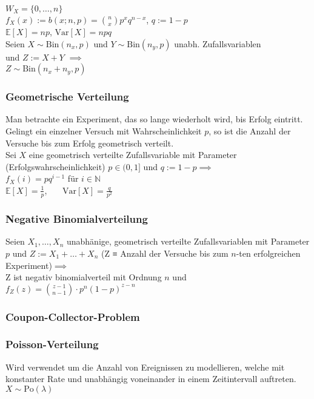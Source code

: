 \documentclass[a4paper,9pt]{extarticle}
\newcommand{\Var}{\text{Var}}
\begin{document}
$W_X = \{0, \dots, n\}$ \\
$f_X(x) := b(x;n,p) = \binom{n}{x} p^xq^{n-x}$, $q := 1-p$ \\

$\mathbb{E}[X] = np$, $\Var[X] = npq$ \\

Seien $X \sim \text{Bin}(n_x,p)$ und $Y \sim \text{Bin}(n_y,p)$ unabh. Zufallsvariablen \\
und $Z := X + Y$ $\implies$ \\
$Z \sim \text{Bin}(n_x + n_y,p)$

\subsubsection*{Geometrische Verteilung}
Man betrachte ein Experiment, das so lange wiederholt wird, bis Erfolg eintritt. Gelingt ein einzelner Versuch mit Wahrscheinlichkeit $p$, so ist die Anzahl der Versuche bis zum Erfolg geometrisch verteilt. \\

Sei $X$ eine geometrisch verteilte Zufallsvariable mit Parameter (Erfolgswahrscheinlichkeit) $p \in (0,1]$ und $q := 1 - p \implies$ \\
$f_X(i) = pq^{i-1}$ für $i \in \mathbb{N}$ \\
$\mathbb{E}[X] = \frac{1}{p}$,~~~ $\Var[X] = \frac{q}{p^2}$ \\

\subsubsection*{Negative Binomialverteilung}
Seien $X_1, \dots, X_n$ unabhänige, geometrisch verteilte Zufallsvariablen mit Parameter $p$ und $Z := X_1 + \dots + X_n$ (Z ≡ Anzahl der Versuche bis zum $n$-ten erfolgreichen Experiment)$ \implies$ \\
Z ist negativ binomialverteil mit Ordnung $n$ und \\
$f_Z(z) = \binom{z - 1}{n - 1} ⋅ p^n(1-p)^{z-n}$

\subsubsection*{Coupon-Collector-Problem}

\subsubsection*{Poisson-Verteilung}
Wird verwendet um die Anzahl von Ereignissen zu modellieren, welche mit konstanter Rate und unabhängig voneinander in einem Zeitintervall auftreten. \\
$X \sim \text{Po}(\lambda)$ \\
\end{document}

